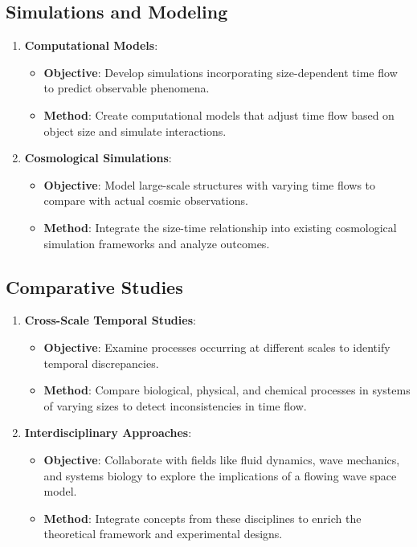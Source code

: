 \documentclass[12pt]{article}
\begin{document}
\subsection{Simulations and Modeling}

\begin{enumerate}
    \item \textbf{Computational Models}:
    \begin{itemize}
        \item \textbf{Objective}: Develop simulations incorporating size-dependent time flow to predict observable phenomena.
        \item \textbf{Method}: Create computational models that adjust time flow based on object size and simulate interactions.
    \end{itemize}
    
    \item \textbf{Cosmological Simulations}:
    \begin{itemize}
        \item \textbf{Objective}: Model large-scale structures with varying time flows to compare with actual cosmic observations.
        \item \textbf{Method}: Integrate the size-time relationship into existing cosmological simulation frameworks and analyze outcomes.
    \end{itemize}
\end{enumerate}

\subsection{Comparative Studies}

\begin{enumerate}
    \item \textbf{Cross-Scale Temporal Studies}:
    \begin{itemize}
        \item \textbf{Objective}: Examine processes occurring at different scales to identify temporal discrepancies.
        \item \textbf{Method}: Compare biological, physical, and chemical processes in systems of varying sizes to detect inconsistencies in time flow.
    \end{itemize}
    
    \item \textbf{Interdisciplinary Approaches}:
    \begin{itemize}
        \item \textbf{Objective}: Collaborate with fields like fluid dynamics, wave mechanics, and systems biology to explore the implications of a flowing wave space model.
        \item \textbf{Method}: Integrate concepts from these disciplines to enrich the theoretical framework and experimental designs.
    \end{itemize}
\end{enumerate}
\end{document}
